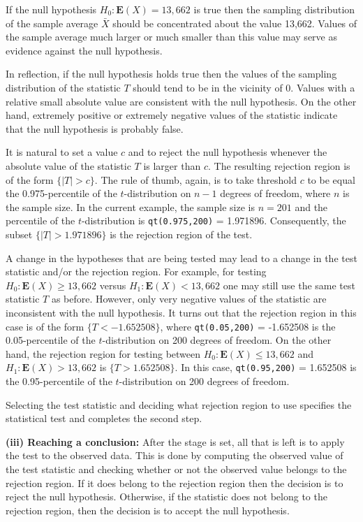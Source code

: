 \documentclass[]{krantz}
\newcommand{\Expec}{\mathbf{E}}
\theoremstyle{definition}
\theoremstyle{definition}
\theoremstyle{definition}
\theoremstyle{remark}
\begin{document}
If the null hypothesis \(H_0:\Expec(X) = 13,662\) is true then the
sampling distribution of the sample average \(\bar X\) should be
concentrated about the value 13,662. Values of the sample average much
larger or much smaller than this value may serve as evidence against the
null hypothesis.

In reflection, if the null hypothesis holds true then the values of the
sampling distribution of the statistic \(T\) should tend to be in the
vicinity of 0. Values with a relative small absolute value are
consistent with the null hypothesis. On the other hand, extremely
positive or extremely negative values of the statistic indicate that the
null hypothesis is probably false.

It is natural to set a value \(c\) and to reject the null hypothesis
whenever the absolute value of the statistic \(T\) is larger than \(c\). The
resulting rejection region is of the form \(\{|T| > c\}\). The rule of
thumb, again, is to take threshold \(c\) to be equal the 0.975-percentile
of the \(t\)-distribution on \(n-1\) degrees of freedom, where \(n\) is the
sample size. In the current example, the sample size is \(n=201\) and the
percentile of the \(t\)-distribution is \texttt{qt(0.975,200)} = 1.971896.
Consequently, the subset \(\{|T| > 1.971896\}\) is the rejection region of
the test.

A change in the hypotheses that are being tested may lead to a change in
the test statistic and/or the rejection region. For example, for testing
\(H_0: \Expec(X) \geq 13,662\) versus \(H_1: \Expec(X) < 13,662\) one may
still use the same test statistic \(T\) as before. However, only very
negative values of the statistic are inconsistent with the null
hypothesis. It turns out that the rejection region in this case is of
the form \(\{T < -1.652508\}\), where \texttt{qt(0.05,200)} = -1.652508 is the
0.05-percentile of the \(t\)-distribution on 200 degrees of freedom. On
the other hand, the rejection region for testing between
\(H_0: \Expec(X) \leq 13,662\) and \(H_1: \Expec(X) > 13,662\) is
\(\{T > 1.652508\}\). In this case, \texttt{qt(0.95,200)} = 1.652508 is the
0.95-percentile of the \(t\)-distribution on 200 degrees of freedom.

Selecting the test statistic and deciding what rejection region to use
specifies the statistical test and completes the second step.

{\textbf{(iii) Reaching a conclusion:}} After the stage is set, all that is
left is to apply the test to the observed data. This is done by
computing the observed value of the test statistic and checking whether
or not the observed value belongs to the rejection region. If it does
belong to the rejection region then the decision is to reject the null
hypothesis. Otherwise, if the statistic does not belong to the rejection
region, then the decision is to accept the null hypothesis.
\end{document}
